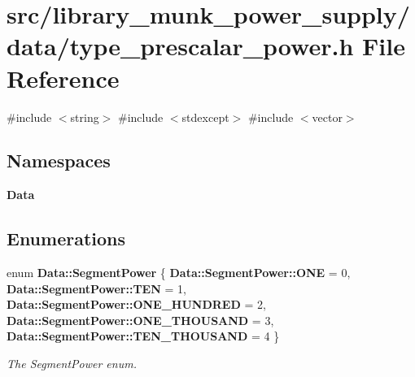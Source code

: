 \section{src/library\+\_\+munk\+\_\+power\+\_\+supply/data/type\+\_\+prescalar\+\_\+power.h File Reference}
\label{type__prescalar__power_8h}
{\ttfamily \#include $<$string$>$}\newline
{\ttfamily \#include $<$stdexcept$>$}\newline
{\ttfamily \#include $<$vector$>$}\newline
\subsection*{Namespaces}
\begin{DoxyCompactItemize}
\item 
 \textbf{ Data}
\end{DoxyCompactItemize}
\subsection*{Enumerations}
\begin{DoxyCompactItemize}
\item 
enum \textbf{ Data\+::\+Segment\+Power} \{ \newline
\textbf{ Data\+::\+Segment\+Power\+::\+O\+NE} = 0, 
\textbf{ Data\+::\+Segment\+Power\+::\+T\+EN} = 1, 
\textbf{ Data\+::\+Segment\+Power\+::\+O\+N\+E\+\_\+\+H\+U\+N\+D\+R\+ED} = 2, 
\textbf{ Data\+::\+Segment\+Power\+::\+O\+N\+E\+\_\+\+T\+H\+O\+U\+S\+A\+ND} = 3, 
\newline
\textbf{ Data\+::\+Segment\+Power\+::\+T\+E\+N\+\_\+\+T\+H\+O\+U\+S\+A\+ND} = 4
 \}\begin{DoxyCompactList}\small\item\em The Segment\+Power enum. \end{DoxyCompactList}
\end{DoxyCompactItemize}
